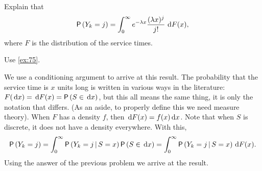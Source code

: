 \begin{exercise}
 Explain that 
\begin{equation}\label{eq:10}
  \P{Y_k = j} = \int_0^\infty e^{-\lambda x}\frac{(\lambda x)^j}{j!}\, \d F(x),
\end{equation}
where $F$ is the distribution of the service times.
\begin{hint}
  Use \cref{ex:75}.
\end{hint}
\begin{solution}
  We use a conditioning argument to arrive at this result. The
  probability that the service time is $x$ units long is written in
  various ways in the literature: $F(\d x) = \d F(x) = \P{S\in \d x}$,
  but this all means the same thing, it is only the notation that
  differs.  (As an aside, to properly define this we need measure
  theory). When $F$ has a density $f$, then
  $\,\text{d}F(x) = f(x) \,\text{d}x$.  Note that when $S$ is discrete, it does not
  have a density everywhere. With this,
    \begin{equation*}
    \P{Y_k=j} = \int_0^\infty \P{Y_k =j\given S=x}\P{S\in \d x} =
    \int_0^\infty \P{Y_k =j\given S=x} \d F(x).
    \end{equation*}
    Using the answer of the previous problem we arrive at the result.
\end{solution}
\end{exercise}

